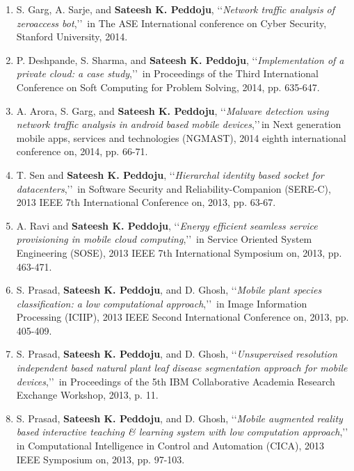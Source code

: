 \begin{enumerate}[label=(C\arabic*).]
	\item
	S. Garg, A. Sarje, and \textbf{Sateesh K. Peddoju}, \lq\lq \textit{Network traffic analysis of zeroaccess bot},\rq\rq\, in The ASE International conference on Cyber Security, Stanford University, 2014.
	
	\item
	P. Deshpande, S. Sharma, and \textbf{Sateesh K. Peddoju}, \lq\lq \textit{Implementation of a private cloud: a case study},\rq\rq\, in Proceedings of the Third International Conference on Soft Computing for Problem Solving, 2014, pp. 635-647.
	
	\item
	A. Arora, S. Garg, and \textbf{Sateesh K. Peddoju}, \lq\lq \textit{Malware detection using network traffic analysis in android based mobile devices},\rq\rq\,in Next generation mobile apps, services and technologies (NGMAST), 2014 eighth international conference on, 2014, pp. 66-71.
	
	\item
	T. Sen and \textbf{Sateesh K. Peddoju}, \lq\lq \textit{Hierarchal identity based socket for datacenters},\rq\rq\, in Software Security and Reliability-Companion (SERE-C), 2013 IEEE 7th International Conference on, 2013, pp. 63-67.
	
	\item
	A. Ravi and \textbf{Sateesh K. Peddoju}, \lq\lq \textit{Energy efficient seamless service provisioning in mobile cloud computing},\rq\rq\, in Service Oriented System Engineering (SOSE), 2013 IEEE 7th International Symposium on, 2013, pp. 463-471.
	
	\item
	S. Prasad, \textbf{Sateesh K. Peddoju}, and D. Ghosh, \lq\lq \textit{Mobile plant species classification: a low computational approach},\rq\rq\, in Image Information Processing (ICIIP), 2013 IEEE Second International Conference on, 2013, pp. 405-409.
	
	\item
	S. Prasad, \textbf{Sateesh K. Peddoju}, and D. Ghosh, \lq\lq \textit{Unsupervised resolution independent based natural plant leaf disease segmentation approach for mobile devices},\rq\rq\, in Proceedings of the 5th IBM Collaborative Academia Research Exchange Workshop, 2013, p. 11.
	
	\item
	S. Prasad, \textbf{Sateesh K. Peddoju}, and D. Ghosh, \lq\lq \textit{Mobile augmented reality based interactive teaching \& learning system with low computation approach},\rq\rq\, in Computational Intelligence in Control and Automation (CICA), 2013 IEEE Symposium on, 2013, pp. 97-103.
	

\end{enumerate}
